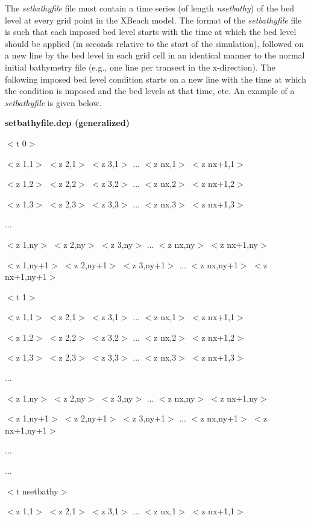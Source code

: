 \documentclass{article}
\begin{document}
\noindent The \textit{setbathyfile }file must contain a time series (of length \textit{nsetbathy}) of the bed level at every grid point in the XBeach model. The format of the \textit{setbathyfile} file is such that each imposed bed level starts with the time at which the bed level should be applied (in seconds relative to the start of the simulation), followed on a new line by the bed level in each grid cell in an identical manner to the normal initial bathymetry file (e.g., one line per transect in the x-direction). The following imposed bed level condition starts on a new line with the time at which the condition is imposed and the bed levels at that time, etc. An example of a \textit{setbathyfile }is given below.

\noindent \textbf{setbathyfile.dep (generalized)}

\noindent $<$t 0$>$

\noindent $<$z 1,1$>$ $<$z 2,1$>$ $<$z 3,1$>$ ... $<$z nx,1$>$ $<$z nx+1,1$>$

\noindent $<$z 1,2$>$ $<$z 2,2$>$ $<$z 3,2$>$ ... $<$z nx,2$>$ $<$z nx+1,2$>$

\noindent $<$z 1,3$>$ $<$z 2,3$>$ $<$z 3,3$>$ ... $<$z nx,3$>$ $<$z nx+1,3$>$

\noindent ...

\noindent $<$z 1,ny$>$ $<$z 2,ny$>$ $<$z 3,ny$>$ ... $<$z nx,ny$>$ $<$z nx+1,ny$>$

\noindent $<$z 1,ny+1$>$ $<$z 2,ny+1$>$ $<$z 3,ny+1$>$ ... $<$z nx,ny+1$>$ $<$z nx+1,ny+1$>$

\noindent $<$t 1$>$

\noindent $<$z 1,1$>$ $<$z 2,1$>$ $<$z 3,1$>$ ... $<$z nx,1$>$ $<$z nx+1,1$>$

\noindent $<$z 1,2$>$ $<$z 2,2$>$ $<$z 3,2$>$ ... $<$z nx,2$>$ $<$z nx+1,2$>$

\noindent $<$z 1,3$>$ $<$z 2,3$>$ $<$z 3,3$>$ ... $<$z nx,3$>$ $<$z nx+1,3$>$

\noindent ...

\noindent $<$z 1,ny$>$ $<$z 2,ny$>$ $<$z 3,ny$>$ ... $<$z nx,ny$>$ $<$z nx+1,ny$>$

\noindent $<$z 1,ny+1$>$ $<$z 2,ny+1$>$ $<$z 3,ny+1$>$ ... $<$z nx,ny+1$>$ $<$z nx+1,ny+1$>$

\noindent ...

\noindent ...

\noindent $<$t nsetbathy$>$

\noindent $<$z 1,1$>$ $<$z 2,1$>$ $<$z 3,1$>$ ... $<$z nx,1$>$ $<$z nx+1,1$>$
\end{document}
